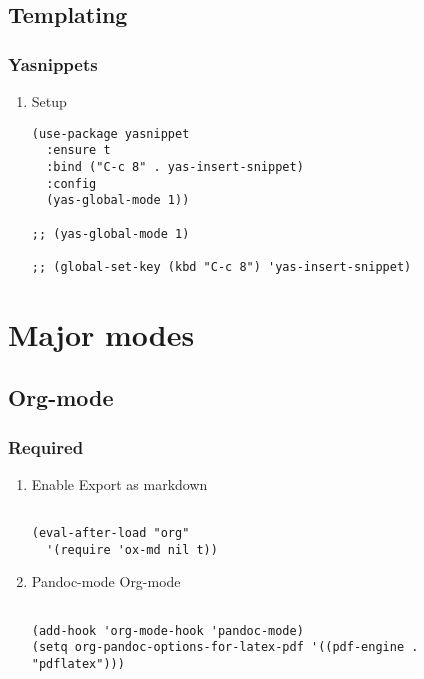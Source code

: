 \documentclass[11pt]{article}
\begin{document}
\subsection{Templating}
\label{sec:org598e102}
\subsubsection{Yasnippets}
\label{sec:org33d2b88}
\begin{enumerate}
\item Setup
\label{sec:org4b412dd}
\begin{verbatim}
(use-package yasnippet
  :ensure t
  :bind ("C-c 8" . yas-insert-snippet)
  :config
  (yas-global-mode 1))

;; (yas-global-mode 1)

;; (global-set-key (kbd "C-c 8") 'yas-insert-snippet)
\end{verbatim}
\end{enumerate}
\section{Major modes}
\label{sec:org3c559f1}
\subsection{Org-mode}
\label{sec:orgbef865a}
\subsubsection{Required}
\label{sec:org5a91a5b}
\begin{enumerate}
\item Enable Export as markdown
\label{sec:orgb95425b}
\begin{verbatim}

(eval-after-load "org"
  '(require 'ox-md nil t))

\end{verbatim}
\item Pandoc-mode Org-mode
\label{sec:orgca06499}
\begin{verbatim}

(add-hook 'org-mode-hook 'pandoc-mode)
(setq org-pandoc-options-for-latex-pdf '((pdf-engine . "pdflatex")))

\end{verbatim}
\end{enumerate}
\end{document}
